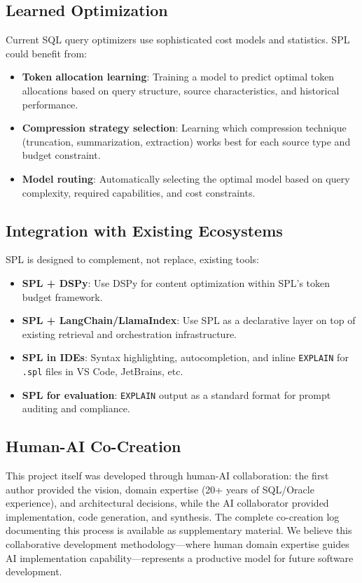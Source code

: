 \documentclass[11pt,a4paper]{article}
\begin{document}
\subsection{Learned Optimization}

Current SQL query optimizers use sophisticated cost models and statistics. SPL could benefit from:

\begin{itemize}[nosep]
  \item \textbf{Token allocation learning}: Training a model to predict optimal token allocations based on query structure, source characteristics, and historical performance.
  \item \textbf{Compression strategy selection}: Learning which compression technique (truncation, summarization, extraction) works best for each source type and budget constraint.
  \item \textbf{Model routing}: Automatically selecting the optimal model based on query complexity, required capabilities, and cost constraints.
\end{itemize}

\subsection{Integration with Existing Ecosystems}

SPL is designed to complement, not replace, existing tools:

\begin{itemize}[nosep]
  \item \textbf{SPL + DSPy}: Use DSPy for content optimization within SPL's token budget framework.
  \item \textbf{SPL + LangChain/LlamaIndex}: Use SPL as a declarative layer on top of existing retrieval and orchestration infrastructure.
  \item \textbf{SPL in IDEs}: Syntax highlighting, autocompletion, and inline \texttt{EXPLAIN} for \texttt{.spl} files in VS Code, JetBrains, etc.
  \item \textbf{SPL for evaluation}: \texttt{EXPLAIN} output as a standard format for prompt auditing and compliance.
\end{itemize}

\subsection{Human-AI Co-Creation}

This project itself was developed through human-AI collaboration: the first author provided the vision, domain expertise (20+ years of SQL/Oracle experience), and architectural decisions, while the AI collaborator provided implementation, code generation, and synthesis. The complete co-creation log documenting this process is available as supplementary material. We believe this collaborative development methodology---where human domain expertise guides AI implementation capability---represents a productive model for future software development.
\end{document}
